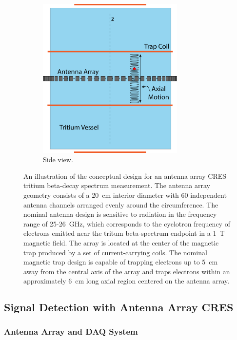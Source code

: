 \begin{figure}[h]
\begin{subfigure}{0.48\textwidth}
        \includegraphics[width=0.8\textwidth]{figs/Chapter-4/230328_deepfilter_paper_apparatus_concept_side_v2.png}
        \caption{Side view.}
        \label{fig:apparatus_concept_side}
    \end{subfigure}
    \caption{An illustration of the conceptual design for an antenna array CRES tritium beta-decay spectrum measurement. The antenna array geometry consists of a 20~cm interior diameter with 60 independent antenna channels arranged evenly around the circumference. The nominal antenna design is sensitive to radiation in the frequency range of 25-26~GHz, which corresponds to the cyclotron frequency of electrons emitted near the tritum beta-spectrum endpoint in a 1~T magnetic field. The array is located at the center of the magnetic trap produced by a set of current-carrying coils. The nominal magnetic trap design is capable of trapping electrons up to 5~cm away from the central axis of the array and traps electrons within an approximately 6~cm long axial region centered on the antenna array.}
    \label{fig:apparatus_concept}
\end{figure}


\subsection{Signal Detection with Antenna Array CRES}
\label{sec:real-time-triggering}


\subsubsection{Antenna Array and DAQ System}
\label{sec:aa-and-daq}

